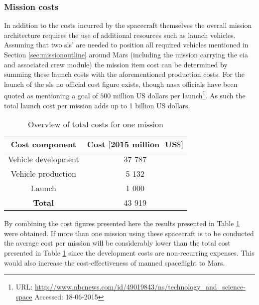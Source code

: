 \subsubsection{Mission costs}
In addition to the costs incurred by the spacecraft themselves the overall mission architecture requires the use of additional resources such as launch vehicles. Assuming that two \gls{sls}' are needed to position all required vehicles mentioned in Section \ref{sec:missionoutline} around Mars (including the mission carrying the \gls{cia} and associated crew module) the mission item cost can be determined by summing these launch costs with the aforementioned production costs. For the launch of the \gls{sls} no official cost figure exists, though \gls{nasa} officials have been quoted as mentioning a goal of $500$ million US dollars per launch\footnote{URL: \url{http://www.nbcnews.com/id/49019843/ns/technology_and_science-space} Accessed: 18-06-2015}. As such the total launch cost per mission adds up to 1 billion US dollars.


\begin{table}[H]
	\centering
	\caption{Overview of total costs for one mission}
	\begin{tabular}{|c|c|}
		\hline
		\textbf{Cost component} & \textbf{Cost $\mathbf{[2015}$ $\mathbf{million \mbox{ } US\$]}$} \\ \hline 
		\hline
		Vehicle development & 37 787 \\
		Vehicle production & 5 132\\
		Launch & 1 000\\ \hline
		\textbf{Total} & 43 919\\ \hline
	\end{tabular}
	\label{tab:missioncosts}
\end{table}

By combining the cost figures presented here the results presented in Table \ref{tab:missioncosts} were obtained. If more than one mission using these spacecraft is to be conducted the average cost per mission will be considerably lower than the total cost presented in Table \ref{tab:missioncosts} since the development costs are non-recurring expenses. This would also increase the cost-effectiveness of manned spaceflight to Mars.